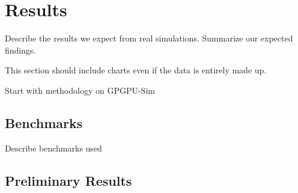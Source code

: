 \section{Results}

Describe the results we expect from real simulations. Summarize our
expected findings.

This section should include charts even if the data is entirely made
up. 

Start with methodology on GPGPU-Sim~\cite{bakhodayuan09} 

\subsection{Benchmarks}
Describe benchmarks used 

\subsection{Preliminary Results}

